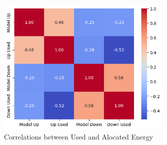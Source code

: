 \begin{figure}[H]
    \centering
    \includegraphics[width=0.75\textwidth]{plots/heatmap_correlation_pred.png}
    \caption{Correlations between Used and Alocated Energy}
    \label{fig:mode_pred_corres}
  \end{figure}


 \par





